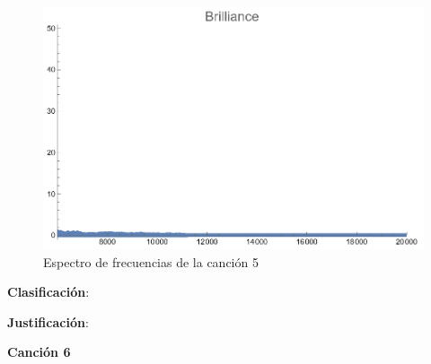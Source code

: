 \documentclass[12pt, letterpaper]{article}
\begin{document}
\begin{figure}[H]
\begin{minipage}{.3\textwidth}
  \end{minipage}
  \begin{minipage}{0.03\textwidth}\end{minipage}
  \begin{minipage}{.3\textwidth}
    \centering
    \includegraphics[width=.9\linewidth]{imgs/Cancion5/brilliance.png}
  \end{minipage}
  \caption{Espectro de frecuencias de la canción 5}
  \label{fig:esp05}
\end{figure}

\textbf{Clasificación}: 

\textbf{Justificación}: 

\newpage

\textbf{\large{Canción 6}}
\end{document}
